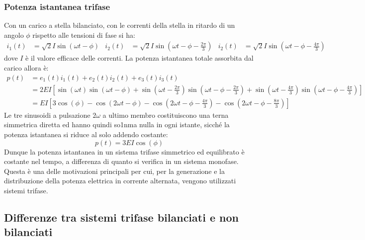 \documentclass{article}
\begin{document}
\subsubsection{Potenza istantanea trifase}
Con un carico a stella bilanciato, con le correnti della stella in ritardo di un angolo $\phi$ rispetto alle tensioni di fase si ha:
\begin{align*}
    i_1(t) &= \sqrt{2} I \sin\left(\omega t - \phi\right) 
    &
    i_2(t) &= \sqrt{2} I \sin\left(\omega t - \phi - \frac{2 \pi}{3}\right)
    &
    i_2(t) &= \sqrt{2} I \sin\left(\omega t - \phi - \frac{4 \pi}{3}\right)
\end{align*}
dove $I$ è il valore efficace delle correnti. La potenza istantanea totale assorbita dal carico allora è:
\begin{align*}
    p(t) &= e_1(t)i_1(t) + e_2(t)i_2(t) + e_3(t)i_3(t)
    \\
    &=2EI \left[\sin(\omega t) \sin(\omega t - \phi)+\sin \left(\omega t - \frac{2 \pi}{3}\right)\sin \left(\omega t - \phi - \frac{2 \pi}{3}\right)+\sin\left(\omega t - \frac{4 \pi}{3}\right)\sin\left(\omega t - \phi - \frac{4 \pi}{3}\right)\right]
    \\
    &= EI \left[3 \cos(\phi) - \cos(2 \omega t - \phi) - \cos \left(2 \omega t - \phi - \frac{4 \pi}{3}\right)-\cos\left(2 \omega t - \phi - \frac{8 \pi}{3}\right)\right]
\end{align*}
Le tre sinusoidi a pulsazione $2 \omega$ a ultimo membro costituiscono una terna simmetrica diretta ed hanno quindi so1nma nulla in ogni istante, sicché la potenza
istantanea si riduce al solo addendo costante:
\[p(t) = 3 EI \cos(\phi)\]
Dunque la potenza istantanea in un sistema trifase simmetrico ed equilibrato è
costante nel tempo, a differenza di quanto si verifica in un sistema monofase. Questa è una delle motivazioni principali per cui, per la generazione e la distribuzione della potenza elettrica in corrente alternata, vengono utilizzati sistemi trifase.


\subsection{Differenze tra sistemi trifase bilanciati e non bilanciati}
\end{document}
